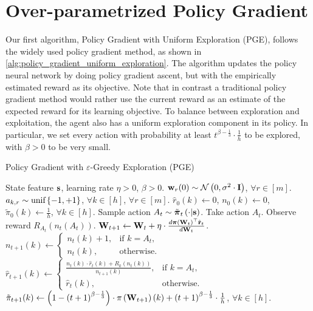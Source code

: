 \section{Over-parametrized Policy Gradient}
\label{sec:policy_gradient}
Our first algorithm, Policy Gradient with Uniform Exploration (PGE), follows the widely used policy gradient method, as shown in \cref{alg:policy_gradient_uniform_exploration}.
The algorithm updates the policy neural network by doing policy gradient ascent, but with the empirically estimated reward as its objective. 
Note that in contrast a traditional policy gradient method would rather use the current reward as an estimate of the expected reward for its learning objective.
To balance between exploration and exploitation, the agent also has a uniform exploration component in its policy. 
In particular, we set every action with probability at least $t^{ \beta - \frac{1}{3}} \cdot \frac{1}{h}$ to be explored, with $\beta > 0$ to be very small. 
\begin{algorithm}[t]
   \caption{Policy Gradient with $\varepsilon$-Greedy Exploration (PGE)}
\label{alg:policy_gradient_uniform_exploration}
\begin{algorithmic}
    State feature ${\mathbf{s}}$, learning rate $\eta > 0$, $\beta > 0$.
   \STATE ${\mathbf{w}}_r(0) \sim {\mathcal{N}}\left( 0, \sigma^2 \cdot {\mathbf{I}} \right)$, $\forall r \in [m]$. $a_{k, r} \sim 
   {\text{unif}}\left\{-1, +1\right\}$, $\forall k \in [h]$, $\forall r \in [m]$.
   \STATE $\hat{r}_{0}(k) \gets 0$, $n_{0}(k) \gets 0$, $\tilde{\pi}_0(k) \gets \frac{1}{h}$, $\forall k \in [h]$.
   \STATE Sample action $A_{t} \sim \tilde{{\boldsymbol{\pi}}}_{t}\left(\cdot \middle| {\mathbf{s}} \right)$. Take action $A_{t}$. Observe reward $R_{ A_{t}}\left(n_{t}\left(A_t\right) \right)$.
   \STATE ${\mathbf{W}}_{t+1} \leftarrow {\mathbf{W}}_t + \eta \cdot \frac{d {\boldsymbol{\pi}}\left({\mathbf{W}}_t\right)^\top \hat{{\mathbf{r}}}_t}{d {\mathbf{W}}_t}$.
   \STATE $n_{t+1}(k) \gets \left. 
		\begin{cases}
		n_{t}(k) + 1, & \text{if } k = A_t, \\
		n_{t}(k), & \text{otherwise}.
		\end{cases}
		\right. \qquad$ 
   $\hat{r}_{t+1}(k) \gets \left. 
		\begin{cases}
		\frac{n_{t}(k) \cdot \hat{r}_{t}(k) + R_{k}\left(n_{t}(k)\right) }{n_{t+1}(k)}, & \text{if } k = A_t, \\
		\hat{r}_{t}(k), & \text{otherwise}.
		\end{cases}
		\right.$
   \STATE $\tilde{\pi}_{t+1}(k) \gets \left( 1 - \left(t+1\right)^{ \beta - \frac{1}{3}} \right) \cdot \pi\left({\mathbf{W}}_{t+1}\right)(k) + \left(t+1\right)^{ \beta - \frac{1}{3}} \cdot \frac{1}{h}$, $\forall k \in [h]$.
   \ENDFOR
\end{algorithmic}
\end{algorithm}

